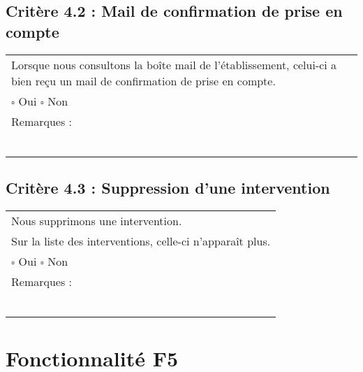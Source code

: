   	\subsection*{Critère 4.2 : Mail de confirmation de prise en compte}
  		\begin{center}
    	 		\begin{tabular}[h]{|p{}|}
			\hline
				Lorsque nous consultons la boîte mail de l'établissement, celui-ci a bien reçu un mail de confirmation de prise en compte.\\
				
				$\square$ Oui  \hfill \hfill $\square$ Non \\\hline Remarques : \\ ~\\
			 \\\hline
     		\end{tabular}
  		\end{center}	
  		
  		
  	\subsection*{Critère 4.3 : Suppression d'une intervention}
  		\begin{center}
    	 		\begin{tabular}[h]{|p{}|}
			\hline
				Nous supprimons une intervention. \\
				Sur la liste des interventions, celle-ci n'apparaît plus. \\
				
				$\square$ Oui  \hfill \hfill $\square$ Non \\\hline Remarques : \\ ~\\
			 \\\hline
     		\end{tabular}
  		\end{center}	

\section{Fonctionnalité F5}
